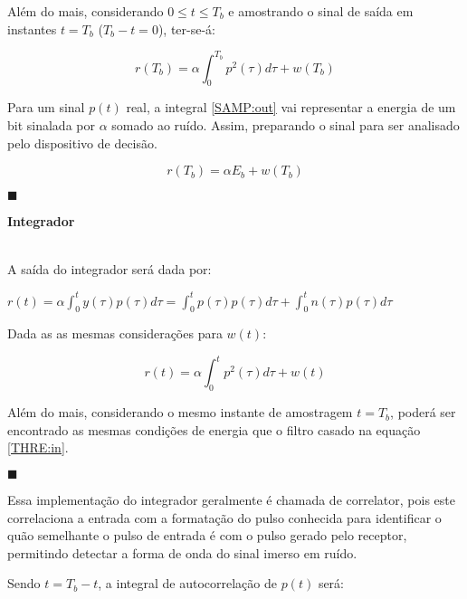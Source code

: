 Além do mais, considerando $0 \leq t \leq T_b$ e amostrando o sinal de saída em instantes $t=T_b$ ($T_b - t = 0$), ter-se-á:

\begin{equation} \label{SAMP:out}
    r(T_b) = \alpha \int_{0}^{T_b} p^2(\tau)d\tau + w(T_b)
\end{equation}

Para um sinal $p(t)$ real, a integral \ref{SAMP:out} vai representar a energia de um bit sinalada por $\alpha$ somado ao ruído. Assim, preparando o sinal para ser analisado pelo dispositivo de decisão.

\begin{equation} \label{THRE:in}
    r(T_b) = \alpha E_b + w(T_b) 
\end{equation}

\begin{flushright}
    $\blacksquare$
\end{flushright}

\large \textbf{Integrador}
\normalsize

\\

A saída do integrador será dada por:
\begin{center}
    $r(t) = \alpha \int_{0}^{t} y(\tau)p(\tau) d\tau = \int_{0}^{t} p(\tau)p(\tau) d\tau + \int_{0}^{t} n(\tau)p(\tau) d\tau  $
\end{center}

Dada as as mesmas considerações para $w(t)$:

\begin{equation} \label{INT:out}
    r(t) = \alpha \int_{0}^{t} p^2(\tau) d\tau + w(t)
\end{equation}

Além do mais, considerando o mesmo instante de amostragem $t = T_b$, poderá ser encontrado as mesmas condições de energia que o filtro casado na equação \ref{THRE:in}.

\begin{flushright}
    $\blacksquare$
\end{flushright}

Essa implementação do integrador geralmente é chamada de correlator, pois este correlaciona a entrada com a formatação do pulso conhecida para identificar o quão semelhante o pulso de entrada é com o pulso gerado pelo receptor, permitindo detectar a forma de onda do sinal imerso em ruído.

Sendo $t = T_b - t$, a integral de autocorrelação de $p(t)$ será:

